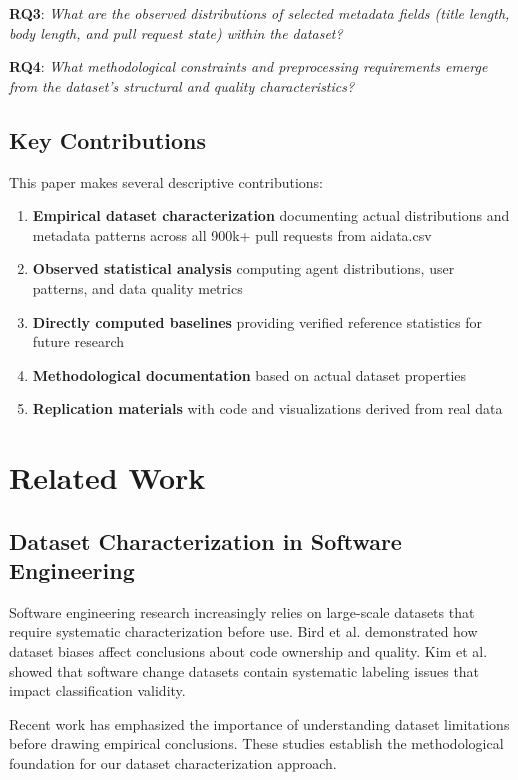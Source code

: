 \documentclass[conference]{IEEEtran}
\begin{document}
\textbf{RQ3}: \textit{What are the observed distributions of selected metadata fields (title length, body length, and pull request state) within the dataset?}

\textbf{RQ4}: \textit{What methodological constraints and preprocessing requirements emerge from the dataset's structural and quality characteristics?}

\subsection{Key Contributions}

This paper makes several descriptive contributions:
\begin{enumerate}
    \item \textbf{Empirical dataset characterization} documenting actual distributions and metadata patterns across all 900k+ pull requests from aidata.csv
    \item \textbf{Observed statistical analysis} computing agent distributions, user patterns, and data quality metrics
    \item \textbf{Directly computed baselines} providing verified reference statistics for future research
    \item \textbf{Methodological documentation} based on actual dataset properties
    \item \textbf{Replication materials} with code and visualizations derived from real data
\end{enumerate}

\section{Related Work}

\subsection{Dataset Characterization in Software Engineering}

Software engineering research increasingly relies on large-scale datasets that require systematic characterization before use. Bird et al. \cite{bird2011dont} demonstrated how dataset biases affect conclusions about code ownership and quality. Kim et al. \cite{kim2008classifying} showed that software change datasets contain systematic labeling issues that impact classification validity.

Recent work has emphasized the importance of understanding dataset limitations before drawing empirical conclusions. These studies establish the methodological foundation for our dataset characterization approach.
\end{document}
